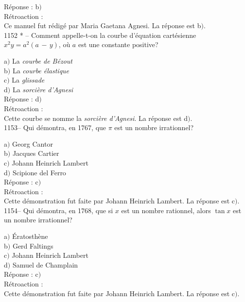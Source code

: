 ﻿\documentclass[letterpaper, 12pt]{article}
\begin{document}
R\'eponse : b$)$\\

R\'etroaction : \\
Ce manuel fut r\'edig\'e par Maria Gaetana Agnesi. La r\'eponse est b$)$.\\

1152 * -- Comment appelle-t-on la courbe d'\'equation cart\'esienne
$x^2y=a^2(a\,-\,y)$, o\`u $a$ est une constante positive?

a$)$ La {\sl courbe de B\'ezout} \\
b$)$ La {\sl courbe \'elastique}  \\
c$)$ La {\sl glissade} \\
d$)$ La {\sl sorci\`ere d'Agnesi}  \\

R\'eponse : d$)$\\

R\'etroaction : \\
Cette courbe se nomme la {\sl sorci\`ere d'Agnesi}. La r\'eponse est d$)$.\\

1153-- Qui d\'emontra, en 1767, que $\pi$ est un nombre irrationnel?

a$)$ Georg Cantor \\
b$)$ Jacques Cartier \\
c$)$ Johann Heinrich Lambert \\
d$)$ Scipione del Ferro\\

R\'eponse : c$)$\\

R\'etroaction : \\
Cette d\'emonstration fut faite par Johann Heinrich Lambert. La r\'eponse
est c$)$.\\

1154-- Qui d\'emontra, en 1768, que si $x$ est un nombre rationnel,
alors $\tan x$ est un nombre irrationnel?

a$)$ \'Eratosth\`ene \\
b$)$ Gerd Faltings \\
c$)$ Johann Heinrich Lambert \\
d$)$ Samuel de Champlain\\

R\'eponse : c$)$\\

R\'etroaction : \\
Cette d\'emonstration fut faite par Johann Heinrich Lambert. La r\'eponse
est c$)$.\\
\end{document}
